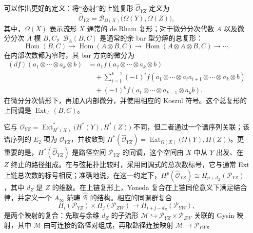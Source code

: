可以作出更好的定义：将“态射”的上链复形 $\widehat{\mathcal{O}}_{YZ}$ 定义为
\begin{equation}\label{eq:2.74}
\widehat{\mathcal{O}}_{YZ}=\mathcal{B}_{\Omega(X)}\bigl(\Omega(Y),\Omega(Z)\bigr),
\end{equation}
其中，$\Omega(X)$ 表示流形 $X$ 通常的 de Rham 复形；对于微分分次代数 $A$ 以及微分分次 $A$ 模 $B,C$，$\mathcal{B}_A(B,C)$ 是通常的余 bar 型分解的总复形：
\begin{equation}\label{eq:2.75}
\operatorname{Hom}(B,C)\longrightarrow\operatorname{Hom}(A\otimes B,C)
\longrightarrow\operatorname{Hom}(A\otimes A\otimes B,C)\longrightarrow\cdots.
\end{equation}
在内部次数都为零时，其 bar 方向的微分为
\begin{equation}\label{eq:2.76}
\begin{aligned}
(df)(a_1\otimes\cdots\otimes a_k\otimes b)
&=a_1f(a_2\otimes\cdots\otimes a_k\otimes b)\\
&\quad+\sum_{i=1}^{k-1}(-1)^if(a_1\otimes\cdots\otimes a_ia_{i+1}\otimes\cdots\otimes a_k\otimes b)\\
&\quad+(-1)^kf(a_1\otimes\cdots\otimes a_{k-1}\otimes a_kb).
\end{aligned}
\end{equation}
在微分分次情形下，再加入内部微分，并使用相应的 Koszul 符号。这个总复形的上同调是 $\operatorname{Ext}_A(B,C)$。

它与 $\mathcal{O}_{YZ}=\operatorname{Ext}_{H^*(X)}^*\bigl(H^*(Y),H^*(Z)\bigr)$ 不同，但二者通过一个谱序列关联；该谱序列的 $E_2$ 项为 $\mathcal{O}_{YZ}$，并收敛到 $H^*(\widehat{\mathcal{O}}_{YZ})=\operatorname{Ext}_{\Omega(X)}\bigl(\Omega(Y),\Omega(Z)\bigr)$。更重要的是，$H^*(\widehat{\mathcal{O}}_{YZ})$ 是路径空间 $\mathcal{P}_{YZ}$ 的同调，这个空间由 $X$ 中从 $Y$ 出发、在 $Z$ 终止的路径组成。在与弦拓扑比较时，采用同调式的总次数标号，它与通常 Ext 上链总次数的标号相反；准确地说，在这一约定下，$H^p(\widehat{\mathcal{O}}_{YZ})\cong H_{p+d_Z}(\mathcal{P}_{YZ})$，其中 $d_Z$ 是 $Z$ 的维数。在上链复形上，Yoneda 复合在上链同伦意义下满足结合律，并定义一个 $A_\infty$ 范畴 $\widehat{\mathcal{B}}$ 的结构。相应的同调群复合
\begin{equation}\label{eq:2.77}
H_i(\mathcal{P}_{YZ})\times H_j(\mathcal{P}_{ZW})\longrightarrow
H_{i+j-d_Z}(\mathcal{P}_{YW}),
\end{equation}
是两个映射的复合：先取与余维 $d_Z$ 的子流形 $\mathcal{M}\hookrightarrow\mathcal{P}_{YZ}\times\mathcal{P}_{ZW}$ 关联的 Gysin 映射，其中 $\mathcal{M}$ 由可连接的路径对组成，再取路径连接映射 $\mathcal{M}\to\mathcal{P}_{YW}$。

